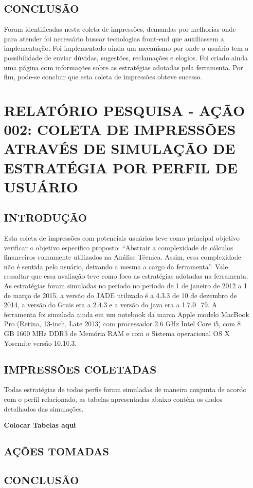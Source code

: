 \begin{apendicesenv}
\section{CONCLUSÃO} 

Foram identificadas nesta coleta de impressões, demandas por melhorias onde para atender foi necessário buscar tecnologias front-end que auxiliassem a implementação. Foi implementado ainda um mecanismo por onde o usuário tem a possibilidade de enviar dúvidas, sugestões, reclamações e elogios. Foi criado ainda uma página com informações sobre as estratégias adotadas pela ferramenta. Por fim, pode-se concluir que esta coleta de impressões obteve sucesso. 

\chapter{RELATÓRIO PESQUISA - AÇÃO 002: COLETA DE IMPRESSÕES ATRAVÉS DE SIMULAÇÃO DE ESTRATÉGIA POR PERFIL DE USUÁRIO}
\section{INTRODUÇÃO}

Esta coleta de impressões com potenciais usuários teve como principal objetivo verificar  o objetivo especifico proposto: “Abstrair a complexidade de cálculos financeiros comumente utilizados na Análise Técnica. Assim, essa complexidade não é sentida pelo usuário, deixando a mesma a cargo da ferramenta”. Vale ressaltar que essa avaliação teve como foco as estratégias adotadas na ferramenta.
As estratégias foram simuladas no período no período de 1 de janeiro de 2012 a 1 de março de 2015, a versão do JADE utilizado é a 4.3.3 de 10 de dezembro de 2014, a versão do Grais era a 2.4.3 e a versão do java era a 1.7.0\_79. A ferramenta foi simulada ainda em um notebook da marca Apple modelo MacBook Pro (Retina, 13-inch, Late 2013) com processador 2.6 GHz Intel Core i5, com 8 GB 1600 MHz DDR3 de Memória RAM e com o Sistema operacional OS X Yosemite versão 10.10.3.

\section{IMPRESSÕES COLETADAS}

Todas estratégias de todos perfis foram simuladas de maneira conjunta de acordo com o perfil relacionado, as tabelas apresentadas abaixo contém os dados detalhados das simulações.

\textbf{Colocar Tabelas aqui }


\section{AÇÕES TOMADAS} 

\section{CONCLUSÃO} 


\end{apendicesenv}
